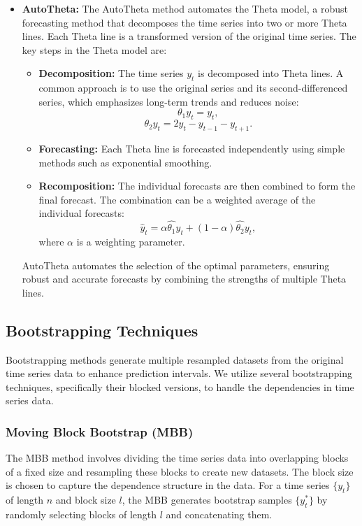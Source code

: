 \begin{itemize}
    \item \textbf{AutoTheta:} The AutoTheta method automates the Theta model, a robust forecasting method that decomposes the time series into two or more Theta lines. Each Theta line is a transformed version of the original time series. The key steps in the Theta model are:
    \begin{itemize}
        \item \textbf{Decomposition:} The time series \(y_t\) is decomposed into Theta lines. A common approach is to use the original series and its second-differenced series, which emphasizes long-term trends and reduces noise:
        \begin{equation}
            \theta_1 y_t = y_t,
        \end{equation}
        \begin{equation}
            \theta_2 y_t = 2 y_t - y_{t-1} - y_{t+1}.
        \end{equation}
        \item \textbf{Forecasting:} Each Theta line is forecasted independently using simple methods such as exponential smoothing.
        \item \textbf{Recomposition:} The individual forecasts are then combined to form the final forecast. The combination can be a weighted average of the individual forecasts:
        \begin{equation}
            \hat{y}_t = \alpha \hat{\theta_1} y_t + (1 - \alpha) \hat{\theta_2} y_t,
        \end{equation}
        where \(\alpha\) is a weighting parameter.
    \end{itemize}
    AutoTheta automates the selection of the optimal parameters, ensuring robust and accurate forecasts by combining the strengths of multiple Theta lines.
    
\end{itemize}


\subsection{Bootstrapping Techniques}
Bootstrapping methods generate multiple resampled datasets from the original time series data to enhance prediction intervals. We utilize several bootstrapping techniques, specifically their blocked versions, to handle the dependencies in time series data.

\subsubsection{Moving Block Bootstrap (MBB)}
The MBB method involves dividing the time series data into overlapping blocks of a fixed size and resampling these blocks to create new datasets. The block size is chosen to capture the dependence structure in the data. For a time series \( \{ y_t \} \) of length \( n \) and block size \( l \), the MBB generates bootstrap samples \( \{ y_t^* \} \) by randomly selecting blocks of length \( l \) and concatenating them.

